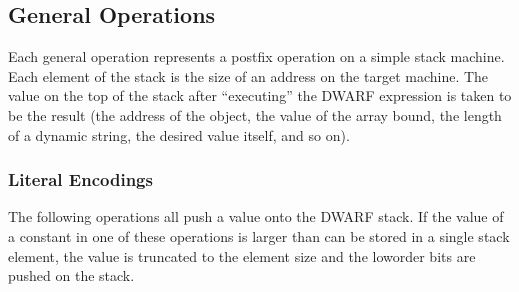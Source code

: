 \subsection{General Operations}
\label{chap:generaloperations}
Each general operation represents a postfix operation on
a simple stack machine. Each element of the stack is the
size of an address on the target machine. The value on the
top of the stack after ``executing'' the DWARF expression
is taken to be the result (the address of the object, the
value of the array bound, the length of a dynamic string,
the desired value itself, and so on).

\subsubsection{Literal Encodings}
\label{chap:literalencodings}
The following operations all push a value onto the DWARF
stack. If the value of a constant in one of these operations
is larger than can be stored in a single stack element, the
value is truncated to the element size and the low\dash order bits
are pushed on the stack.

